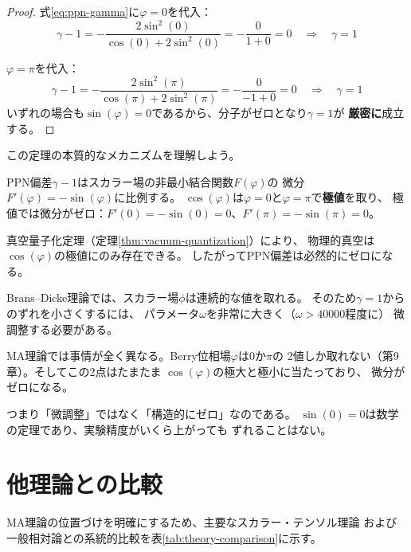 \begin{proof}
式\eqref{eq:ppn-gamma}に$\varphi = 0$を代入：
\[
\gamma - 1 = -\frac{2\sin^2(0)}{\cos(0) + 2\sin^2(0)}
= -\frac{0}{1 + 0} = 0
\quad\Longrightarrow\quad \gamma = 1
\]

$\varphi = \pi$を代入：
\[
\gamma - 1 = -\frac{2\sin^2(\pi)}{\cos(\pi) + 2\sin^2(\pi)}
= -\frac{0}{-1 + 0} = 0
\quad\Longrightarrow\quad \gamma = 1
\]
いずれの場合も$\sin(\varphi) = 0$であるから、分子がゼロとなり$\gamma = 1$が
\textbf{厳密に}成立する。
\end{proof}

\noindent
この定理の本質的なメカニズムを理解しよう。

PPN偏差$\gamma - 1$はスカラー場の非最小結合関数$F(\varphi)$の
微分$F'(\varphi) = -\sin(\varphi)$に比例する。
$\cos(\varphi)$は$\varphi = 0$と$\varphi = \pi$で\textbf{極値}を取り、
極値では微分がゼロ：$F'(0) = -\sin(0) = 0$、$F'(\pi) = -\sin(\pi) = 0$。

真空量子化定理（定理\ref{thm:vacuum-quantization}）により、
物理的真空は$\cos(\varphi)$の極値にのみ存在できる。
したがってPPN偏差は必然的にゼロになる。

\begin{hsbox}
Brans--Dicke理論では、スカラー場$\phi$は連続的な値を取れる。
そのため$\gamma = 1$からのずれを小さくするには、
パラメータ$\omega$を非常に大きく（$\omega > 40000$程度に）
微調整する必要がある。

MA理論では事情が全く異なる。Berry位相場$\varphi$は$0$か$\pi$の
2値しか取れない（第9章）。そしてこの2点はたまたま
$\cos(\varphi)$の極大と極小に当たっており、
微分がゼロになる。

つまり「微調整」ではなく「構造的にゼロ」なのである。
$\sin(0) = 0$は数学の定理であり、実験精度がいくら上がっても
ずれることはない。
\end{hsbox}


\section{他理論との比較}
\label{sec:10.3}

MA理論の位置づけを明確にするため、主要なスカラー・テンソル理論
および一般相対論との系統的比較を表\ref{tab:theory-comparison}に示す。


